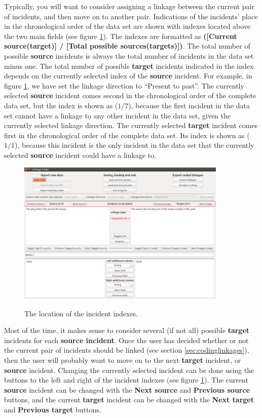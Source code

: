 \documentclass{memoir}
\begin{document}
Typically, you will want to consider assigning a linkage between the current pair of incidents, and then move on to another pair. Indications of the incidents' place in the chronological order of the data set are shown with indexes located above the two main fields (see figure \ref{fig:indexes}). The indexes are formatted as \textbf{([Current source(target)] / [Total possible sources(targets)])}. The total number of possible \textbf{source} incidents is always the total number of incidents in the data set minus one. The total number of possible \textbf{target} incidents indicated in the index depends on the currently selected index of the \textbf{source} incident. For example, in figure \ref{fig:indexes}, we have set the linkage direction to ``Present to past''. The currently selected \textbf{source} incident comes second in the chronological order of the complete data set, but the index is shown as (\(1 / 7\)), because the first incident in the data set cannot have a linkage to any other incident in the data set, given the currently selected linkage direction. The currently selected \textbf{target} incident comes first in the chronological order of the complete data set. Its index is shown as (\(1 / 1\)), because this incident is the only incident in the data set that the currently selected \textbf{source} incident could have a linkage to.    

\begin{figure}[h!]
  \centering
  \caption{The location of the incident indexes.}
  \includegraphics[width=100mm]{Screenshot_7.pdf}
  \label{fig:indexes}
\end{figure}

Most of the time, it makes sense to consider several (if not all) possible \textbf{target} incidents for each \textbf{source incident}. Once the user has decided whether or not the current pair of incidents should be linked (see section \ref{sec:codinglinkages}), then the user will probably want to move on to the next \textbf{target} incident, or \textbf{source} incident. Changing the currently selected incident can be done using the buttons to the left and right of the incident indexes (see figure \ref{fig:indexes}). The current \textbf{source} incident can be changed with the \textbf{Next source} and \textbf{Previous source} buttons, and the current \textbf{target} incident can be changed with the \textbf{Next target} and \textbf{Previous target} buttons.
\end{document}
